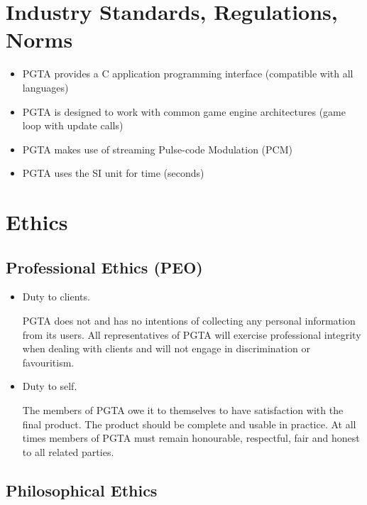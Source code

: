 \documentclass{tufte-handout}
\begin{document}
\newpage
\section{Industry Standards, Regulations, Norms}
\begin{itemize}
    \item PGTA provides a C application programming interface (compatible with all languages)
    \item PGTA is designed to work with common game engine architectures (game loop with update calls)
    \item PGTA makes use of streaming Pulse-code Modulation (PCM) 
    \item PGTA uses the SI unit for time (seconds)
\end{itemize}

\newpage
\section{Ethics}

\subsection{Professional Ethics (PEO)}

\begin{itemize}

\item Duty to clients.

PGTA does not and has no intentions of collecting any personal information from its users. All representatives of PGTA
will exercise professional integrity when dealing with clients and will not engage in discrimination or favouritism. 

\item Duty to self.

The members of PGTA owe it to themselves to have satisfaction with the final product. The product should be complete 
and usable in practice. At all times members of PGTA must remain honourable, respectful, fair and honest to all related
parties. 

\end{itemize}

\subsection{Philosophical Ethics}
\end{document}
